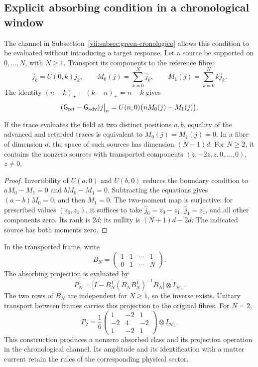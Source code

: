 \subsection{Explicit absorbing condition in a chronological window}
\label{vii:subsec:absorcion-momentos}

The channel in Subsection~\ref{vii:subsec:green-cronologico} allows
this condition to be evaluated without introducing a target response.
Let a source be supported on \(0,\ldots,N\), with \(N\geq1\).
Transport its components to the reference fibre:
\[
 \widehat j_k=U(0,k)j_k,\qquad
 M_0(j)=\sum_{k=0}^N\widehat j_k,\qquad
 M_1(j)=\sum_{k=0}^Nk\widehat j_k.
\]
The identity \((n-k)_+-(k-n)_+=n-k\) gives
\begin{equation}
 (\mathsf{G}_{\rm ret}-\mathsf{G}_{\rm adv})j\big|_n
 =U(n,0)\bigl(nM_0(j)-M_1(j)\bigr).
 \label{vii:eq:diferencia-green-momentos}
\end{equation}

\begin{proposition}
\label{vii:prop:absorcion-momentos}
If the trace evaluates the field at two distinct positions \(a,b\),
equality of the advanced and retarded traces is equivalent to
\(M_0(j)=M_1(j)=0\). In a fibre of dimension \(d\), the space of
such sources has dimension \((N-1)d\). For \(N\geq2\), it
contains the nonzero sources with transported components
\((z,-2z,z,0,\ldots,0)\), \(z\neq0\).
\end{proposition}
\begin{proof}
Invertibility of \(U(a,0)\) and \(U(b,0)\) reduces the boundary
condition to \(aM_0-M_1=0\) and \(bM_0-M_1=0\).
Subtracting the equations gives \((a-b)M_0=0\), and then \(M_1=0\).
The two-moment map is surjective: for prescribed values
\((z_0,z_1)\), it suffices to take
\(\widehat j_0=z_0-z_1\), \(\widehat j_1=z_1\), and all other
components zero. Its rank is \(2d\); its nullity is
\((N+1)d-2d\). The indicated source has both moments zero.
\end{proof}

In the transported frame, write
\[
 B_N=\begin{pmatrix}1&1&\cdots&1\\0&1&\cdots&N\end{pmatrix}.
\]
The absorbing projection is evaluated by
\begin{equation}
 P_N=\bigl[I-B_N^{\mathsf T}(B_NB_N^{\mathsf T})^{-1}B_N\bigr]
       \otimes I_{\mathcal H_0}.
 \label{vii:eq:proyector-momentos-cronologicos}
\end{equation}
The two rows of \(B_N\) are independent for \(N\geq1\), so the
inverse exists. Unitary transport between frames carries this projection
to the original fibres. For \(N=2\),
\[
 P_2=\frac16
 \begin{pmatrix}1&-2&1\\-2&4&-2\\1&-2&1\end{pmatrix}
 \otimes I_{\mathcal H_0}.
\]
This construction produces a nonzero absorbed class and its projection
operation in the chronological channel. Its amplitude and its identification
with a matter current retain the rules of the corresponding physical sector.

